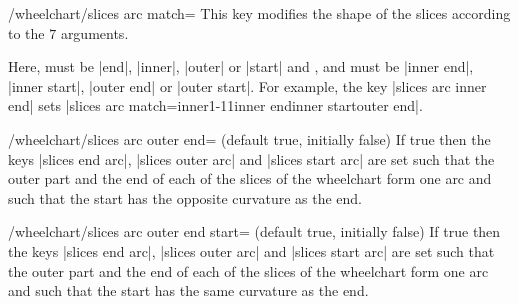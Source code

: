 \documentclass[a4paper,english,dvipsnames]{ltxdoc}
\begin{document}
\begin{key}{/wheelchart/slices arc match=}
This key modifies the shape of the slices according to the $7$ arguments.

Here,  must be |end|, |inner|, |outer| or |start| and ,  and  must be |inner end|, |inner start|, |outer end| or |outer start|. For example, the key |slices arc inner end| sets |slices arc match={inner}{1}{-1}{1}{inner end}{inner start}{outer end}|.
\begin{codeexample}[width=10cm]
\end{codeexample}
\end{key}
\begin{key}{/wheelchart/slices arc outer end= (default true, initially false)}
If true then the keys |slices end arc|, |slices outer arc| and |slices start arc| are set such that the outer part and the end of each of the slices of the wheelchart form one arc and such that the start has the opposite curvature as the end.
\end{key}
\begin{key}{/wheelchart/slices arc outer end start= (default true, initially false)}
If true then the keys |slices end arc|, |slices outer arc| and |slices start arc| are set such that the outer part and the end of each of the slices of the wheelchart form one arc and such that the start has the same curvature as the end.
\begin{codeexample}[width=10cm]
\begin{tikzpicture}
\wheelchart[
  data=,
  gap polar=5,
  middle={%
    slices arc\\%
    outer end start%
  },
  middle style={font=\ttfamily},
  slices arc outer end start,
  value=1,
  wheel data=\WCvarC
]{\exampleforthismanual}
\end{tikzpicture}
\end{codeexample}
\end{key}
\end{document}
